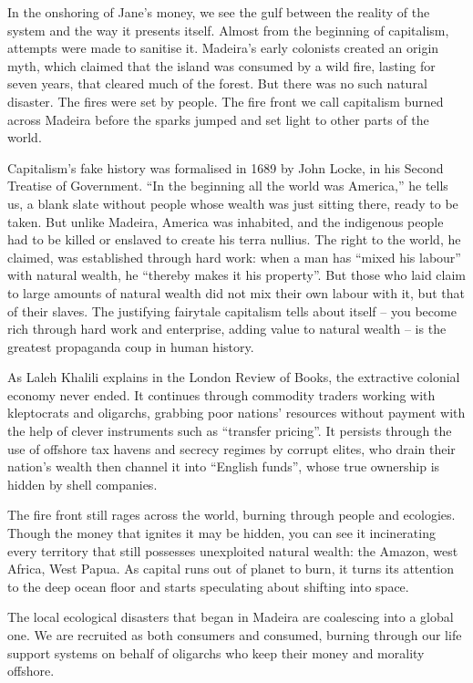 \documentclass[
]{book}
\begin{document}
In the onshoring of Jane's money, we see the gulf between the reality of the system and the way it presents itself. Almost from the beginning of capitalism, attempts were made to sanitise it. Madeira's early colonists created an origin myth, which claimed that the island was consumed by a wild fire, lasting for seven years, that cleared much of the forest. But there was no such natural disaster. The fires were set by people. The fire front we call capitalism burned across Madeira before the sparks jumped and set light to other parts of the world.

Capitalism's fake history was formalised in 1689 by John Locke, in his Second Treatise of Government. ``In the beginning all the world was America,'' he tells us, a blank slate without people whose wealth was just sitting there, ready to be taken. But unlike Madeira, America was inhabited, and the indigenous people had to be killed or enslaved to create his terra nullius. The right to the world, he claimed, was established through hard work: when a man has ``mixed his labour'' with natural wealth, he ``thereby makes it his property''. But those who laid claim to large amounts of natural wealth did not mix their own labour with it, but that of their slaves. The justifying fairytale capitalism tells about itself -- you become rich through hard work and enterprise, adding value to natural wealth -- is the greatest propaganda coup in human history.

As Laleh Khalili explains in the London Review of Books, the extractive colonial economy never ended. It continues through commodity traders working with kleptocrats and oligarchs, grabbing poor nations' resources without payment with the help of clever instruments such as ``transfer pricing''. It persists through the use of offshore tax havens and secrecy regimes by corrupt elites, who drain their nation's wealth then channel it into ``English funds'', whose true ownership is hidden by shell companies.

The fire front still rages across the world, burning through people and ecologies. Though the money that ignites it may be hidden, you can see it incinerating every territory that still possesses unexploited natural wealth: the Amazon, west Africa, West Papua. As capital runs out of planet to burn, it turns its attention to the deep ocean floor and starts speculating about shifting into space.

The local ecological disasters that began in Madeira are coalescing into a global one. We are recruited as both consumers and consumed, burning through our life support systems on behalf of oligarchs who keep their money and morality offshore.
\end{document}
